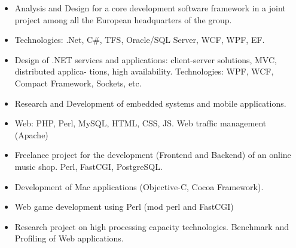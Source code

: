 \documentclass[10pt,a4paper]{altacv}
\begin{document}
\divider

\begin{itemize}
	\item Analysis and Design for a core development software framework in a joint project among all the European headquarters of the group.
	\item Technologies: .Net, C\#, TFS, Oracle/SQL Server, WCF, WPF, EF.
\end{itemize}


\divider

\begin{itemize}
	\item Design of .NET services and applications: client-server solutions, MVC, distributed applica-
	tions, high availability. Technologies: WPF, WCF, Compact Framework, Sockets, etc.
	\item Research and Development of embedded systems and mobile applications.
\end{itemize}

\divider

\begin{itemize}
	\item Web: PHP, Perl, MySQL, HTML, CSS, JS. Web traffic management (Apache)
\end{itemize}

\divider

\begin{itemize}
	\item Freelance project for the development (Frontend and Backend) of an online music shop. Perl, FastCGI, PostgreSQL.
	\item Development of Mac applications (Objective-C, Cocoa Framework).
\end{itemize}

{}

\begin{itemize}
	\item Web game development using Perl (mod perl and FastCGI)
	\item Research project on high processing capacity technologies. Benchmark and Profiling of Web applications.
\end{itemize}
\end{document}
